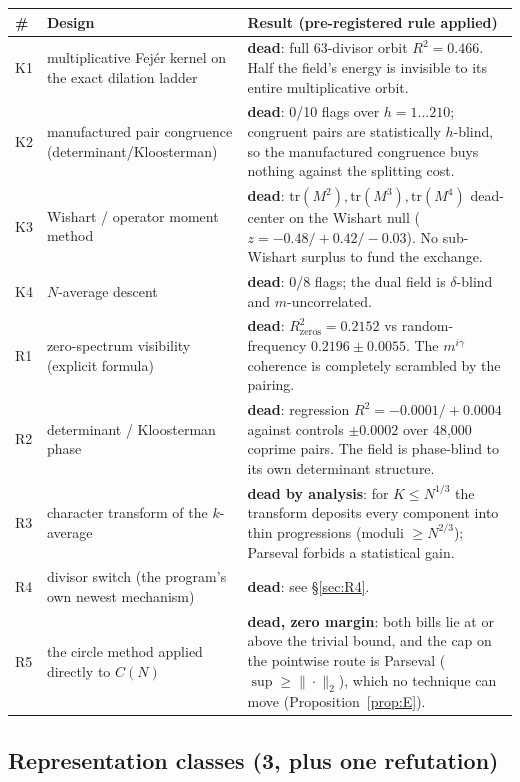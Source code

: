 \documentclass[11pt,a4paper]{article}
\theoremstyle{plain}
\theoremstyle{definition}
\begin{document}
\begin{longtable}{p{}p{}p{}}
\hline
\# & Design & Result (pre-registered rule applied)\\
\hline
\endhead
K1 & multiplicative Fej\'er kernel on the exact dilation ladder &
 \textbf{dead}: full 63-divisor orbit $R^2 = 0.466$. Half the field's
 energy is invisible to its entire multiplicative orbit.\\
K2 & manufactured pair congruence (determinant/Kloosterman) &
 \textbf{dead}: 0/10 flags over $h = 1\ldots210$; congruent pairs are
 statistically $h$-blind, so the manufactured congruence buys nothing
 against the splitting cost.\\
K3 & Wishart / operator moment method &
 \textbf{dead}: $\mathrm{tr}(M^2),\mathrm{tr}(M^3),\mathrm{tr}(M^4)$
 dead-center on the Wishart null ($z = -0.48/+0.42/-0.03$). No
 sub-Wishart surplus to fund the exchange.\\
K4 & $N$-average descent &
 \textbf{dead}: 0/8 flags; the dual field is $\delta$-blind and
 $m$-uncorrelated.\\
R1 & zero-spectrum visibility (explicit formula) &
 \textbf{dead}: $R^2_{\text{zeros}} = 0.2152$ vs random-frequency
 $0.2196\pm0.0055$. The $m^{i\gamma}$ coherence is completely
 scrambled by the pairing.\\
R2 & determinant / Kloosterman phase &
 \textbf{dead}: regression $R^2 = -0.0001/+0.0004$ against controls
 $\pm0.0002$ over 48{,}000 coprime pairs. The field is phase-blind to
 its own determinant structure.\\
R3 & character transform of the $k$-average &
 \textbf{dead by analysis}: for $K \le N^{1/3}$ the transform deposits
 every component into thin progressions (moduli $\ge N^{2/3}$);
 Parseval forbids a statistical gain.\\
R4 & divisor switch (the program's own newest mechanism) &
 \textbf{dead}: see \S\ref{sec:R4}.\\
R5 & the circle method applied directly to $C(N)$ &
 \textbf{dead, zero margin}: both bills lie at or above the trivial
 bound, and the cap on the pointwise route is Parseval
 ($\sup\ge\|\cdot\|_2$), which no technique can move
 (Proposition~\ref{prop:E}).\\
\hline
\end{longtable}

\subsection{Representation classes (3, plus one refutation)}
\end{document}

